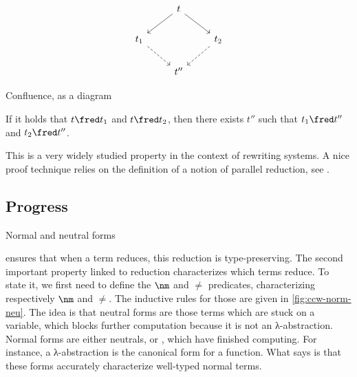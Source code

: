 \begin{marginfigure}
  \[\begin{tikzcd}
    & t \arrow[dl] \arrow[dr] & \\
    t_1 \arrow[dr, dashed] && t_2 \arrow[dl, dashed] \\
    & t'' &
  \end{tikzcd}\]
  \caption{Confluence, as a diagram}
\end{marginfigure}

\begin{property}
  \label{prop:confluence}
  If it holds that
  $t \red t_1$ and $t \red t_2$, then there exists $t''$ such that
  $t_1 \red t''$ and $t_2 \red t''$.
\end{property}

This is a very widely studied property in the context of rewriting systems. A nice
proof technique relies on the definition of a notion of parallel reduction, see
.

\subsection{Progress}

\begin{marginfigure}
  \caption{Normal and neutral forms}
  \label{fig:ccw-norm-neu}
\end{marginfigure}

 ensures that when a term reduces, this reduction is type-preserving.
The second important property linked to reduction characterizes which terms reduce.
To state it, we first need to define the $\nm$ and $\ne$ predicates,
characterizing respectively  $\nm$ and  $\ne$.
The inductive rules for those are given in \cref{fig:ccw-norm-neu}.
The idea is that neutral forms are those terms which are stuck on a variable, which blocks
further computation because it is not an λ-abstraction. Normal forms are either neutrals,
or , which have finished computing. For instance, a λ-abstraction is
the canonical form for a function. What  says is that these forms accurately
characterize well-typed normal terms.

